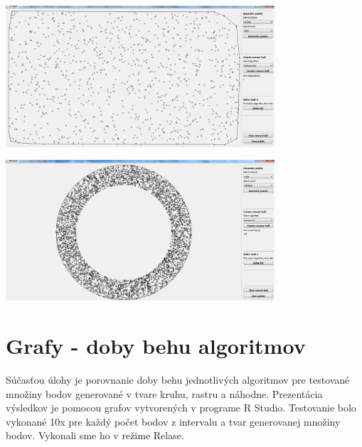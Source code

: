 \documentclass[12pt]{article}
\begin{document}
\begin{center}
   \includegraphics[width=10cm]{./img/CH_points_generate_random_1000.png}
\end{center}
\clearpage
\begin{center}
   \includegraphics[width=10cm]{./img/milion_points.png}
\end{center}

\clearpage 
\section{Grafy - doby behu algoritmov}
Súčasťou úlohy je porovnanie doby behu jednotlivých algoritmov pre testované množiny bodov generované v tvare kruhu, rastru a náhodne. Prezentácia výsledkov je pomocou grafov vytvorených v programe R Studio. Testovanie bolo vykonané 10x pre každý počet bodov z intervalu a tvar generovanej množiny bodov. Vykonali sme ho v režime Relase.
\end{document}
